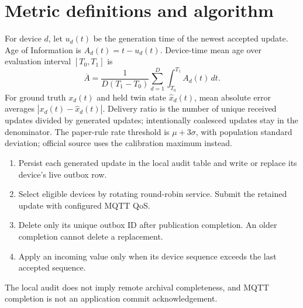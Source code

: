 \documentclass[11pt,a4paper]{article}
\begin{document}
\section*{Metric definitions and algorithm}
For device $d$, let $u_d(t)$ be the generation time of the newest accepted update. Age of Information is $A_d(t)=t-u_d(t)$. Device-time mean age over evaluation interval $[T_0,T_1]$ is
\[
\overline A=\frac{1}{D(T_1-T_0)}\sum_{d=1}^{D}\int_{T_0}^{T_1} A_d(t)\,dt.
\]
For ground truth $x_d(t)$ and held twin state $\hat x_d(t)$, mean absolute error averages $|x_d(t)-\hat x_d(t)|$. Delivery ratio is the number of unique received updates divided by generated updates; intentionally coalesced updates stay in the denominator. The paper-rule rate threshold is $\mu+3\sigma$, with population standard deviation; official source uses the calibration maximum instead.
\begin{enumerate}
\item Persist each generated update in the local audit table and write or replace its device's live outbox row.
\item Select eligible devices by rotating round-robin service. Submit the retained update with configured MQTT QoS.
\item Delete only its unique outbox ID after publication completion. An older completion cannot delete a replacement.
\item Apply an incoming value only when its device sequence exceeds the last accepted sequence.
\end{enumerate}
The local audit does not imply remote archival completeness, and MQTT completion is not an application commit acknowledgement.
\end{document}
